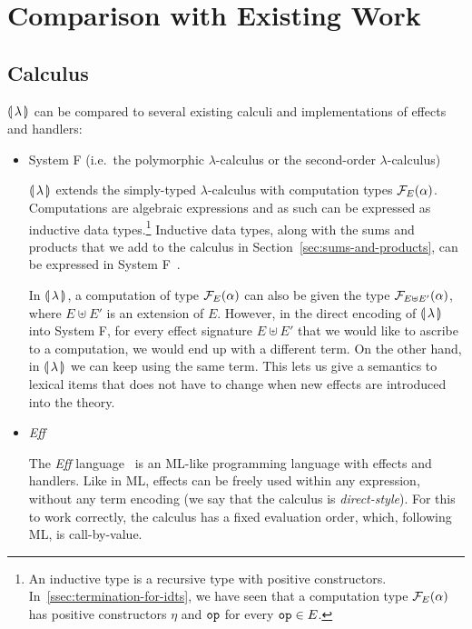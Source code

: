 \section{Comparison with Existing Work}
\label{sec:comparison}

\subsection{Calculus}
\label{ssec:comparison-calculus}

${\llparenthesis \, \lambda \, \rrparenthesis}$ can be compared to several existing calculi and implementations of
effects and handlers:

\begin{itemize}
\item System F (i.e.\ the polymorphic $\lambda$-calculus or the
  second-order $\lambda$-calculus)

  ${\llparenthesis \, \lambda \, \rrparenthesis}$ extends the simply-typed $\lambda$-calculus with computation
  types $\mathcal{F}_E(\alpha)$. Computations are algebraic expressions and as such
  can be expressed as inductive data types.\footnote{An inductive type is a
    recursive type with positive
    constructors. In~\ref{ssec:termination-for-idts}, we have seen that a
    computation type $\mathcal{F}_E(\alpha)$ has positive constructors $\eta$ and
    $\mathtt{op}$ for every $\mathtt{op} \in E$.} Inductive data types, along with
  the sums and products that we add to the calculus in
  Section~\ref{sec:sums-and-products}, can be expressed in System
  F~\cite{wadler1990recursive}.

  In ${\llparenthesis \, \lambda \, \rrparenthesis}$, a computation of type $\mathcal{F}_E(\alpha)$ can also be given the
  type $\mathcal{F}_{E \uplus E'}(\alpha)$, where $E \uplus E'$ is an extension of
  $E$. However, in the direct encoding of ${\llparenthesis \, \lambda \, \rrparenthesis}$ into System F, for every
  effect signature $E \uplus E'$ that we would like to ascribe to a
  computation, we would end up with a different term. On the other hand, in
  ${\llparenthesis \, \lambda \, \rrparenthesis}$ we can keep using the same term. This lets us give a semantics to
  lexical items that does not have to change when new effects are
  introduced into the theory.

\item \emph{Eff}

  The \emph{Eff} language~\cite{bauer2012programming} is an ML-like
  programming language with effects and handlers. Like in ML, effects can
  be freely used within any expression, without any term encoding (we say
  that the calculus is \emph{direct-style}). For this to work correctly,
  the calculus has a fixed evaluation order, which, following ML, is
  call-by-value.


\end{itemize}
